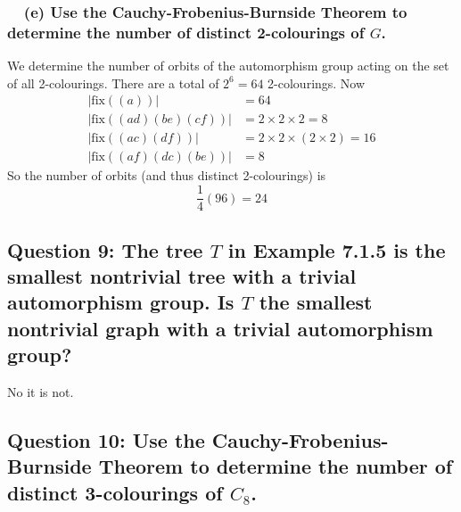 \documentclass[letterpaper, 11pt]{article}
\newcommand{\1}{\mathds{1}}	%
\theoremstyle{definition}
\begin{document}
\subsubsection*{ \ \ (e) Use the Cauchy-Frobenius-Burnside Theorem to determine the number of distinct 2-colourings of $G$.}
We determine the number of orbits of the automorphism group acting on the set of all 2-colourings. There are a total of $2^6 = 64$ 2-colourings. Now 
\begin{align*}
|\text{fix}((a))| & = 64 \\
|\text{fix}((ad)(be)(cf))| & = 2 \times 2 \times 2 = 8 \\
|\text{fix}((ac)(df))| & = 2 \times 2 \times (2 \times 2) = 16\\
|\text{fix}((af)(dc)(be))| & = 8
\end{align*}
So the number of orbits (and thus distinct 2-colourings) is \[
\frac{1}{4} (96) = 24
\]

\subsection*{Question 9: The tree $T$ in Example 7.1.5 is the smallest nontrivial tree with a trivial automorphism group. Is $T$ the smallest nontrivial graph with a trivial automorphism group?}
No it is not. 


\subsection*{Question 10: Use the Cauchy-Frobenius-Burnside Theorem to determine the number of distinct
3-colourings of $C_8$.}
\end{document}
